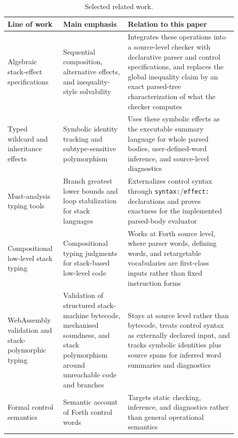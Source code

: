 \documentclass[acmsmall,screen,review,anonymous,nonacm]{acmart}
\begin{document}
\begin{table}[t]
\centering
\caption{Selected related work.}
\label{tab:prior-comparison}
\small
\begin{tabular}{@{}>{\raggedright\arraybackslash}p{0.20\linewidth}>{\raggedright\arraybackslash}p{0.26\linewidth}>{\raggedright\arraybackslash}p{0.44\linewidth}@{}}
\hline
Line of work & Main emphasis & Relation to this paper \\
\hline
Algebraic stack-effect specifications \cite{poial1991algebraic,poial1992multiple,poial1994algebraic} & Sequential composition, alternative effects, and inequality-style solvability & Integrates these operations into a source-level checker with declarative parser and control specifications, and replaces the global inequality claim by an exact parsed-tree characterization of what the checker computes \\
Typed wildcard and inheritance effects \cite{stoddart1993type,poial2002wildcards} & Symbolic identity tracking and subtype-sensitive polymorphism & Uses these symbolic effects as the executable summary language for whole parsed bodies, user-defined-word inference, and source-level diagnostics \\
Must-analysis typing tools \cite{poial2006typing} & Branch greatest lower bounds and loop stabilization for stack languages & Externalizes control syntax through \texttt{syntax:}/\texttt{effect:} declarations and proves exactness for the implemented parsed-body evaluator \\
Compositional low-level stack typing \cite{saabas2006compositional} & Compositional typing judgments for stack-based low-level code & Works at Forth source level, where parser words, defining words, and retargetable vocabularies are first-class inputs rather than fixed instruction forms \\
WebAssembly validation and stack-polymorphic typing \cite{webassembly2026spec,mcdermott2022wasm,watt2018wasm} & Validation of structured stack-machine bytecode, mechanised soundness, and stack polymorphism around unreachable code and branches & Stays at source level rather than bytecode, treats control syntax as externally declared input, and tracks symbolic identities plus source spans for inferred word summaries and diagnostics \\
Formal control semantics \cite{power2004formal} & Semantic account of Forth control words & Targets static checking, inference, and diagnostics rather than general operational semantics \\
\hline
\end{tabular}
\end{table}
\end{document}
